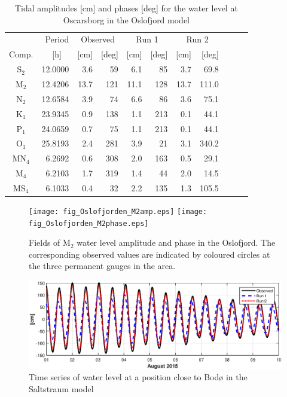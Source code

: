 \begin{table}[ht]
\caption{Tidal amplitudes [cm] and phases [deg] for the water level at Oscarsborg in the Oslofjord model}
\label{tab:Oscarsborg}
\centering
\begin{tabular}{crrrrrrrrrr} \hline
      & Period & \multicolumn{2}{c}{Observed} & \multicolumn{2}{c}{Run 1} & \multicolumn{2}{c}{Run 2}  \\
Comp. & [h] $\;\;$ & [cm] & [deg] & [cm] & [deg] & [cm] & [deg]  \\ \hline 
S$_2$  & 12.0000 &  3.6 &  59  &   6.1 &  85  &  3.7 &  69.8  \\
M$_2$  & 12.4206 & 13.7 & 121  &  11.1 & 128  & 13.7 & 111.0  \\
N$_2$  & 12.6584 &  3.9 &  74  &   6.6 &  86  &  3.6 &  75.1  \\
K$_1$  & 23.9345 &  0.9 & 138  &   1.1 & 213  &  0.1 &  44.1  \\
P$_1$  & 24.0659 &  0.7 &  75  &   1.1 & 213  &  0.1 &  44.1  \\
O$_1$  & 25.8193 &  2.4 & 281  &   3.9 &  21  &  3.1 & 340.2  \\
MN$_4$ &  6.2692 &  0.6 & 308  &   2.0 & 163  &  0.5 &  29.1  \\
M$_4$  &  6.2103 &  1.7 & 319  &   1.4 &  44  &  2.0 &  14.5  \\
MS$_4$ &  6.1033 &  0.4 &  32  &   2.2 & 135  &  1.3 & 105.5  \\ \hline 
\end{tabular}
\end{table}




\begin{figure}[!t]
\centering
\texttt{[image: fig\_Oslofjorden\_M2amp.eps]}
\texttt{[image: fig\_Oslofjorden\_M2phase.eps]}
\caption{Fields of M$_2$ water level amplitude and phase in the Oslofjord. The corresponding observed values are indicated by coloured circles at the three permanent gauges in the area.}
\label{fig:Oslofjord_tidal_fields}
\end{figure}


\begin{figure}[!t]
\centering
\includegraphics[width=\textwidth]{fig_Saltstraumen_timeseries}
\caption{Time series of water level at a position close to Bod{\o} in the Saltstraum model}
\label{fig:Saltstraumen_timeseries}
\end{figure}


